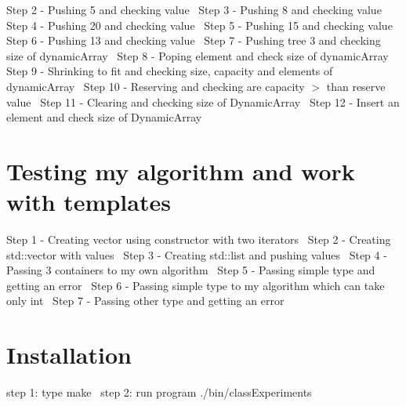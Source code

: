 Step 2 -\/ Pushing 5 and checking value~\newline
Step 3 -\/ Pushing 8 and checking value~\newline
Step 4 -\/ Pushing 20 and checking value~\newline
Step 5 -\/ Pushing 15 and checking value~\newline
Step 6 -\/ Pushing 13 and checking value~\newline
Step 7 -\/ Pushing tree 3 and checking size of dynamic\+Array~\newline
Step 8 -\/ Poping element and check size of dynamic\+Array~\newline
Step 9 -\/ Shrinking to fit and checking size, capacity and elements of dynamic\+Array~\newline
Step 10 -\/ Reserving and checking are capacity $>$ than reserve value~\newline
Step 11 -\/ Clearing and checking size of Dynamic\+Array~\newline
Step 12 -\/ Insert an element and check size of Dynamic\+Array~\newline
 \hypertarget{index_test_4}{}\section{Testing my algorithm and work with templates}\label{index_test_4}
Step 1 -\/ Creating vector using constructor with two iterators~\newline
Step 2 -\/ Creating std\+::vector with values~\newline
Step 3 -\/ Creating std\+::list and pushing values~\newline
Step 4 -\/ Passing 3 containers to my own algorithm~\newline
Step 5 -\/ Passing simple type and getting an error~\newline
Step 6 -\/ Passing simple type to my algorithm which can take only int~\newline
Step 7 -\/ Passing other type and getting an error~\newline
 \hypertarget{index_Installation}{}\section{Installation}\label{index_Installation}
step 1\+: type make~\newline
step 2\+: run program ./bin/class\+Experiments 